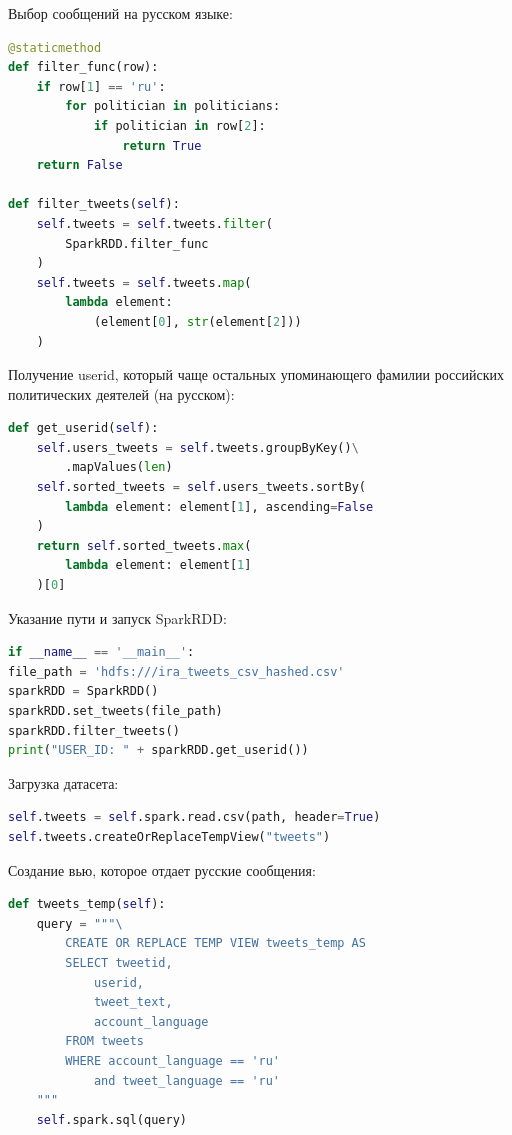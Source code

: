 Выбор сообщений на русском языке:

\begin{lstlisting}[language={Python}, caption={Выбор сообщений}, label=lst:rdd2]
@staticmethod
def filter_func(row):
	if row[1] == 'ru':
		for politician in politicians:
			if politician in row[2]:
				return True
	return False
	
def filter_tweets(self):
	self.tweets = self.tweets.filter(
		SparkRDD.filter_func
	)
	self.tweets = self.tweets.map(
		lambda element: 
			(element[0], str(element[2]))
	)
\end{lstlisting}

Получение userid, который чаще остальных упоминающего фамилии российских политических деятелей (на русском):

\begin{lstlisting}[language={Python}, caption={Получение userid}, label=lst:rdd3]
def get_userid(self):
	self.users_tweets = self.tweets.groupByKey()\
		.mapValues(len)
	self.sorted_tweets = self.users_tweets.sortBy(
		lambda element: element[1], ascending=False
	)
	return self.sorted_tweets.max(
		lambda element: element[1]
	)[0]
\end{lstlisting}

Указание пути и запуск SparkRDD:

\begin{lstlisting}[language={Python}, caption={Получение userid}, label=lst:rdd4]
if __name__ == '__main__':
file_path = 'hdfs:///ira_tweets_csv_hashed.csv'
sparkRDD = SparkRDD()
sparkRDD.set_tweets(file_path)
sparkRDD.filter_tweets()
print("USER_ID: " + sparkRDD.get_userid())
\end{lstlisting}

Загрузка датасета:

\begin{lstlisting}[language={Python}, caption={Получение userid}, label=lst:sql1]
self.tweets = self.spark.read.csv(path, header=True)
self.tweets.createOrReplaceTempView("tweets")
\end{lstlisting}

Создание вью, которое отдает русские сообщения:

\begin{lstlisting}[language={Python}, caption={Получение вью с русскими сообщениями}, label=lst:sql2]
def tweets_temp(self):
	query = """\
		CREATE OR REPLACE TEMP VIEW tweets_temp AS
		SELECT tweetid, 
			userid, 
			tweet_text, 
			account_language
		FROM tweets 
		WHERE account_language == 'ru' 
			and tweet_language == 'ru'
	"""
	self.spark.sql(query)
\end{lstlisting}

